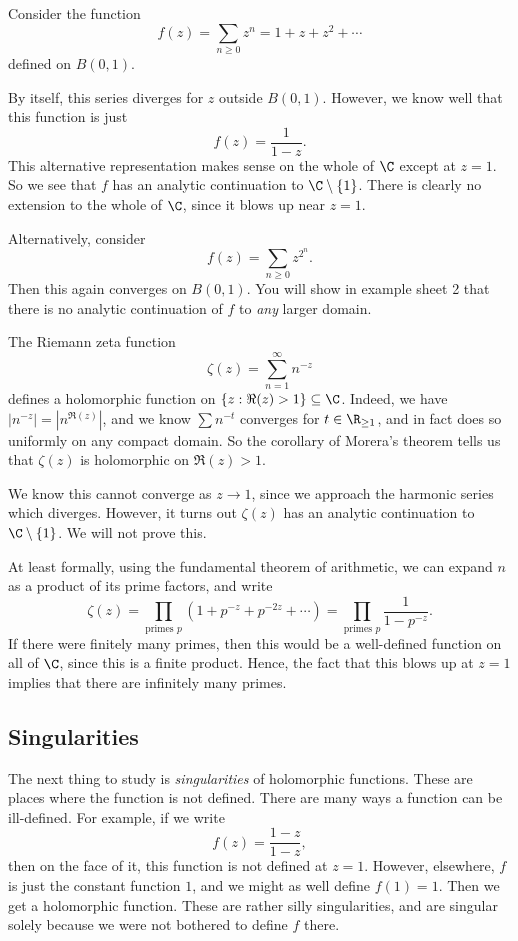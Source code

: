 \documentclass[a4paper]{article}
\begin{document}
\begin{eg}
  Consider the function
  \[
    f(z) = \sum_{n \geq 0} z^n = 1 + z + z^2 + \cdots
  \]
  defined on $B(0, 1)$.

  By itself, this series diverges for $z$ outside $B(0, 1)$. However, we know well that this function is just
  \[
    f(z) = \frac{1}{1 - z}.
  \]
  This alternative representation makes sense on the whole of $\C$ except at $z = 1$. So we see that $f$ has an analytic continuation to $\C \setminus \{1\}$. There is clearly no extension to the whole of $\C$, since it blows up near $z = 1$.
\end{eg}

\begin{eg}
  Alternatively, consider
  \[
    f(z) = \sum_{n \geq 0} z^{2^n}.
  \]
  Then this again converges on $B(0, 1)$. You will show in example sheet 2 that there is no analytic continuation of $f$ to \emph{any} larger domain.
\end{eg}

\begin{eg}
  The Riemann zeta function
  \[
    \zeta(z) = \sum_{n = 1}^\infty n^{-z}
  \]
  defines a holomorphic function on $\{z: \Re(z) > 1\} \subseteq \C$. Indeed, we have $|n^{-z}| = |n^{\Re(z)}|$, and we know $\sum n^{-t}$ converges for $t \in \R_{\geq 1}$, and in fact does so uniformly on any compact domain. So the corollary of Morera's theorem tells us that $\zeta(z)$ is holomorphic on $\Re(z) > 1$.

  We know this cannot converge as $z \to 1$, since we approach the harmonic series which diverges. However, it turns out $\zeta(z)$ has an analytic continuation to $\C \setminus \{1\}$. We will not prove this.

  At least formally, using the fundamental theorem of arithmetic, we can expand $n$ as a product of its prime factors, and write
  \[
    \zeta(z) = \prod_{\text{primes }p} (1 + p^{-z} + p^{-2z} + \cdots) = \prod_{\text{primes }p} \frac{1}{1 - p^{-z}}.
  \]
  If there were finitely many primes, then this would be a well-defined function on all of $\C$, since this is a finite product. Hence, the fact that this blows up at $z = 1$ implies that there are infinitely many primes.
\end{eg}

\subsection{Singularities}
The next thing to study is \emph{singularities} of holomorphic functions. These are places where the function is not defined. There are many ways a function can be ill-defined. For example, if we write
\[
  f(z) = \frac{1 - z}{1 - z},
\]
then on the face of it, this function is not defined at $z = 1$. However, elsewhere, $f$ is just the constant function $1$, and we might as well define $f(1) = 1$. Then we get a holomorphic function. These are rather silly singularities, and are singular solely because we were not bothered to define $f$ there.
\end{document}
